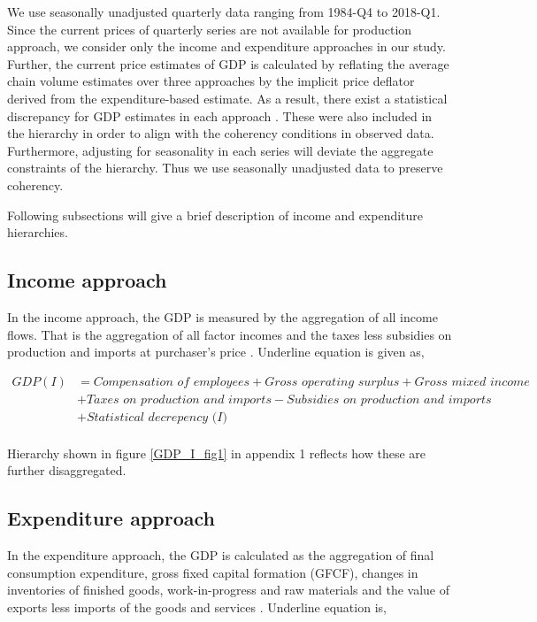 \documentclass[graybox]{svmult}
\begin{document}
We use seasonally unadjusted quarterly data ranging from 1984-Q4 to 2018-Q1. Since the current prices of quarterly series are not available for production approach, we consider only the income and expenditure approaches in our study. Further, the current price estimates of GDP is calculated by reflating the average chain volume estimates over three approaches by the implicit price deflator derived from the expenditure-based estimate. As a result, there exist a statistical discrepancy for GDP estimates in each approach \citep{ABS2018}. These were also included in the hierarchy in order to align with the coherency conditions in observed data. Furthermore, adjusting for seasonality in each series will deviate the aggregate constraints of the hierarchy. Thus we use seasonally unadjusted data to preserve coherency.


Following subsections will give a brief description of income and expenditure hierarchies.

\subsection{Income approach}

In the income approach, the GDP is measured by the aggregation of all income flows. That is the aggregation of all factor incomes  and the taxes less subsidies on production and imports at purchaser's price \citep{ABS2015}. Underline equation is given as, 
\begin{small}
	\begin{align*}
	GDP(I) &= \textit{Compensation of employees} + \textit{Gross operating surplus} + \textit{Gross mixed income}\\ &+ \textit{Taxes on production and imports} - \textit{Subsidies on production and imports}\\ &+ \textit{Statistical decrepency (I)}\\
	\end{align*}
\end{small}
Hierarchy shown in figure \ref{GDP_I_fig1} in appendix 1 reflects how these are further disaggregated. 

\subsection{Expenditure approach}

In the expenditure approach, the GDP is calculated as the aggregation of final consumption expenditure, gross fixed capital formation (GFCF), changes in inventories of finished goods, work-in-progress and raw materials and the value of exports less imports of the goods and services \citep{ABS2015}. Underline equation is, 
\end{document}

